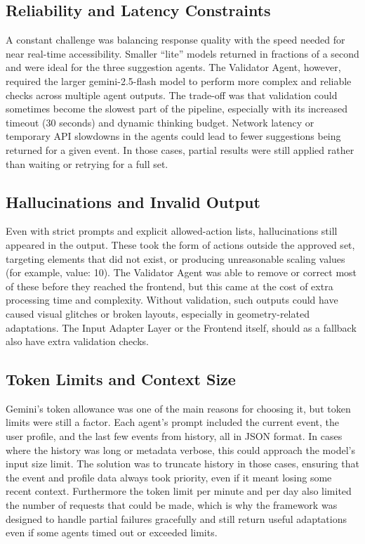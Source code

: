\documentclass[openany]{book}
\begin{document}
\subsection{Reliability and Latency Constraints}
A constant challenge was balancing response quality with the speed needed for near real-time accessibility. Smaller “lite” models returned in fractions of a second and were ideal for the three suggestion agents. The Validator Agent, however, required the larger gemini-2.5-flash model to perform more complex and reliable checks across multiple agent outputs. The trade-off was that validation could sometimes become the slowest part of the pipeline, especially with its increased timeout (30 seconds) and dynamic thinking budget.
Network latency or temporary API slowdowns in the agents could lead to fewer suggestions being returned for a given event. In those cases, partial results were still applied rather than waiting or retrying for a full set.

\subsection{Hallucinations and Invalid Output}
Even with strict prompts and explicit allowed-action lists, hallucinations still appeared in the output. These took the form of actions outside the approved set, targeting elements that did not exist, or producing unreasonable scaling values (for example, value: 10). The Validator Agent was able to remove or correct most of these before they reached the frontend, but this came at the cost of extra processing time and complexity. Without validation, such outputs could have caused visual glitches or broken layouts, especially in geometry-related adaptations. The Input Adapter Layer or the Frontend itself, should as a fallback also have extra validation checks.

\subsection{Token Limits and Context Size}
Gemini’s token allowance was one of the main reasons for choosing it, but token limits were still a factor. Each agent’s prompt included the current event, the user profile, and the last few events from history, all in JSON format. In cases where the history was long or metadata verbose, this could approach the model’s input size limit. The solution was to truncate history in those cases, ensuring that the event and profile data always took priority, even if it meant losing some recent context. Furthermore the token limit per minute and per day also limited the number of requests that could be made, which is why the framework was designed to handle partial failures gracefully and still return useful adaptations even if some agents timed out or exceeded limits.
\end{document}
